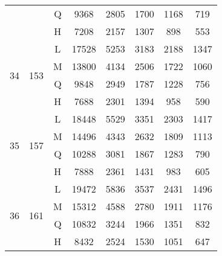 \begin{table}[H]
\begin{tabular}{|c|c|c|c|c|c|c|c|}
                    &                      & Q & 9368  & 2805 & 1700 & 1168 & 719  \\ \cline{3-8}
                    &                      & H & 7208  & 2157 & 1307 & 898  & 553  \\ \hline
\multirow{4}{*}{34} & \multirow{4}{*}{153} & L & 17528 & 5253 & 3183 & 2188 & 1347 \\ \cline{3-8}
                    &                      & M & 13800 & 4134 & 2506 & 1722 & 1060 \\ \cline{3-8}
                    &                      & Q & 9848  & 2949 & 1787 & 1228 & 756  \\ \cline{3-8}
                    &                      & H & 7688  & 2301 & 1394 & 958  & 590  \\ \hline
\multirow{4}{*}{35} & \multirow{4}{*}{157} & L & 18448 & 5529 & 3351 & 2303 & 1417 \\ \cline{3-8}
                    &                      & M & 14496 & 4343 & 2632 & 1809 & 1113 \\ \cline{3-8}
                    &                      & Q & 10288 & 3081 & 1867 & 1283 & 790  \\ \cline{3-8}
                    &                      & H & 7888  & 2361 & 1431 & 983  & 605  \\ \hline
\multirow{4}{*}{36} & \multirow{4}{*}{161} & L & 19472 & 5836 & 3537 & 2431 & 1496 \\ \cline{3-8}
                    &                      & M & 15312 & 4588 & 2780 & 1911 & 1176 \\ \cline{3-8}
                    &                      & Q & 10832 & 3244 & 1966 & 1351 & 832  \\ \cline{3-8}
                    &                      & H & 8432  & 2524 & 1530 & 1051 & 647  \\ \hline
\end{tabular}
\end{table}

